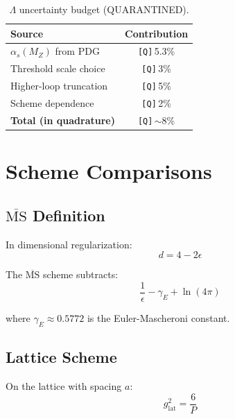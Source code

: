 \documentclass[11pt,a4paper]{article}
\newcommand{\Qnum}[1]{\textcolor{red!70!black}{\texttt{[Q]}}\,#1}
\theoremstyle{definition}
\begin{document}
\begin{table}[ht]
\centering
\caption{$\Lambda$ uncertainty budget (QUARANTINED).}
\label{tab:uncert-budget}
\begin{tabular}{lc}
\toprule
Source & Contribution \\
\midrule
$\alpha_s(M_Z)$ from PDG & \Qnum{5.3\%} \\
Threshold scale choice & \Qnum{3\%} \\
Higher-loop truncation & \Qnum{5\%} \\
Scheme dependence & \Qnum{2\%} \\
\midrule
\textbf{Total (in quadrature)} & \Qnum{$\sim 8\%$} \\
\bottomrule
\end{tabular}
\end{table}

\section{Scheme Comparisons}
\label{app:scheme-compare}

\subsection{$\overline{\text{MS}}$ Definition}
\label{subsec:msbar-def-app}

In dimensional regularization:
\begin{equation}
\label{eq:dim-reg}
d = 4 - 2\epsilon
\end{equation}

The $\overline{\text{MS}}$ scheme subtracts:
\begin{equation}
\label{eq:msbar-subtract}
\frac{1}{\epsilon} - \gamma_E + \ln(4\pi)
\end{equation}

where $\gamma_E \approx 0.5772$ is the Euler-Mascheroni constant.

\subsection{Lattice Scheme}
\label{subsec:lattice-scheme}

On the lattice with spacing $a$:
\begin{equation}
\label{eq:lattice-coupling}
g_{\text{lat}}^2 = \frac{6}{P}
\end{equation}
\end{document}
